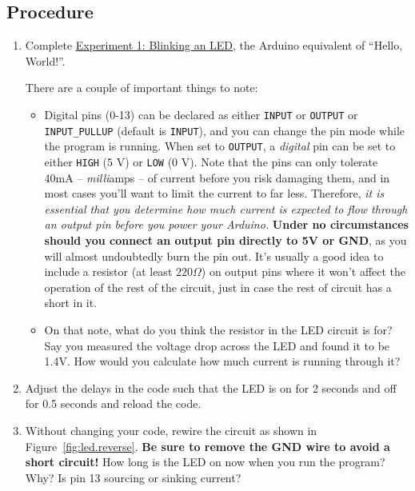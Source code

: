 \documentclass[11pt]{article} %
\begin{document}
\subsection*{Procedure}
\begin{enumerate}
\item Complete \href{https://learn.sparkfun.com/tutorials/sik-experiment-guide-for-arduino---v32/experiment-1-blinking-an-led}{\underline{Experiment 1: Blinking an LED}}, the Arduino equivalent of “Hello, World!”.

There are a couple of important things to note:
\begin{itemize}
\item Digital pins (0-13) can be declared as either \verb|INPUT| or \verb|OUTPUT| or \verb|INPUT_PULLUP| (default is \verb|INPUT|), and you can change the pin mode while the program is running. When set to \verb|OUTPUT|, a \emph{digital} pin can be set to either \verb|HIGH| (5 V) or \verb|LOW| (0 V). Note that the pins can only tolerate 40mA -- \emph{milli}amps -- of current before you risk damaging them, and in most cases you’ll want to limit the current to far less. Therefore, \emph{it is essential that you determine how much current is expected to flow through an output pin before you power your Arduino.} {\bf Under no circumstances should you connect an output pin directly to 5V or GND}, as you will almost undoubtedly burn the pin out. It's usually a good idea to include a resistor (at least $220\Omega$) on output pins where it won't affect the operation of the rest of the circuit, just in case the rest of circuit has a short in it. 
\item On that note, what do you think the resistor in the LED circuit is for? Say you measured the voltage drop across the LED and found it to be 1.4V. How would you calculate how much current is running through it?

\end{itemize}
\item Adjust the delays in the code such that the LED is on for 2 seconds and off for 0.5 seconds and reload the code.
\item Without changing your code, rewire the circuit as shown in Figure~\ref{fig:led.reverse}. {\bf Be sure to remove the GND wire to avoid a short circuit!} How long is the LED on now when you run the program? Why? Is pin 13 sourcing or sinking current?


\end{enumerate}
\end{document}
